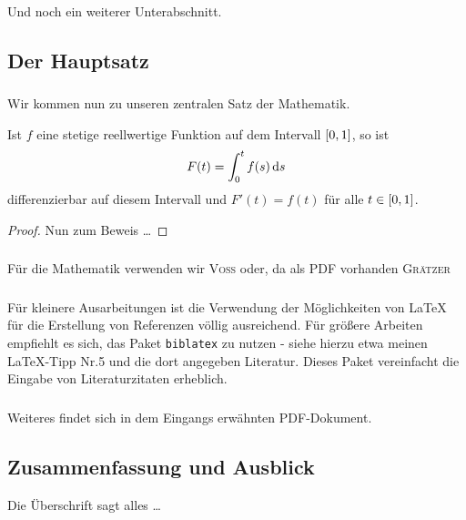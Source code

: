 \subsubsection{} 
%
Und noch ein weiterer Unterabschnitt.
%
\subsection{Der Hauptsatz}
\subsubsection{}
Wir kommen nun zu unseren zentralen Satz der Mathematik.
%
\begin{theorem}\label{thm:hauptsatz}
%	
Ist $ f $ eine stetige reellwertige Funktion auf dem Intervall\/ $ \left[ 0,1 \right] $, so ist
%
\[
  	F( t ) = \int_{ 0 }^{ t } f(s) \mathop{}\!\mathrm{d}{s}
\]
%
differenzierbar auf diesem Intervall und $ F'(t) = f(t) $ für alle $ t \in  \left[ 0,1 \right] $.
\end{theorem}
%
\begin{proof}
Nun zum Beweis \ldots 
\end{proof}
%
\subsubsection{}
Für die Mathematik verwenden wir \textsc{Voss} \cite{voss-math} oder, da als PDF vorhanden \textsc{Grätzer} \cite{graetzer-ma}

\subsubsection{}
Für kleinere Ausarbeitungen ist die Verwendung der Möglichkeiten von \LaTeX{} für die Erstellung von Referenzen völlig ausreichend.
Für größere Arbeiten empfiehlt es sich, das Paket \texttt{biblatex} zu nutzen - siehe hierzu etwa meinen \LaTeX{}-Tipp Nr.5 und die dort angegeben Literatur.
Dieses Paket vereinfacht die Eingabe von Literaturzitaten erheblich.
 
\subsubsection{}
Weiteres findet sich in dem Eingangs erwähnten PDF-Dokument.

\subsection{Zusammenfassung und Ausblick}
Die Überschrift sagt alles \ldots


